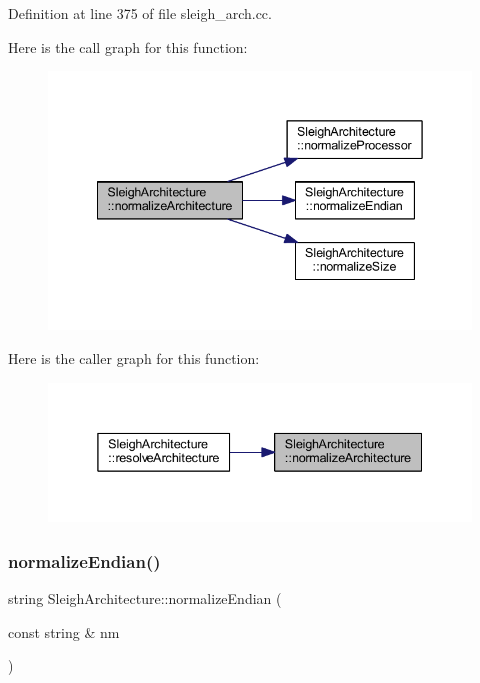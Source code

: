 Definition at line 375 of file sleigh\+\_\+arch.\+cc.

Here is the call graph for this function\+:
\nopagebreak
\begin{figure}[H]
\begin{center}
\leavevmode
\includegraphics[width=342pt]{class_sleigh_architecture_a8053081371771a941248809754fc836f_cgraph}
\end{center}
\end{figure}
Here is the caller graph for this function\+:
\nopagebreak
\begin{figure}[H]
\begin{center}
\leavevmode
\includegraphics[width=338pt]{class_sleigh_architecture_a8053081371771a941248809754fc836f_icgraph}
\end{center}
\end{figure}
\mbox{\label{class_sleigh_architecture_adfe35a4bb676b3676188d936eacccdb3}} 
\subsubsection{\texorpdfstring{normalizeEndian()}{normalizeEndian()}}
{\footnotesize\ttfamily string Sleigh\+Architecture\+::normalize\+Endian (\begin{DoxyParamCaption}\item[{const string \&}]{nm }\end{DoxyParamCaption})\hspace{0.3cm}{\ttfamily [static]}}



